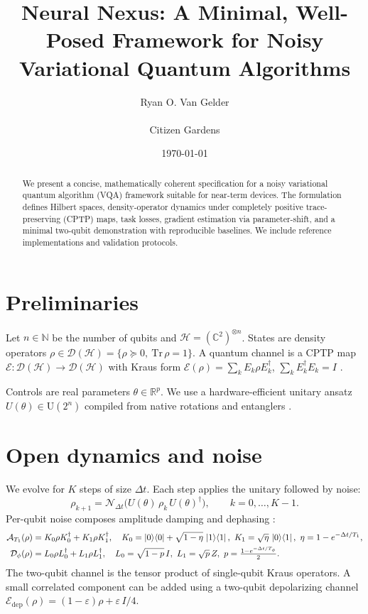 \documentclass[11pt]{article}
\title{Neural Nexus: A Minimal, Well-Posed Framework for Noisy Variational Quantum Algorithms}
\author{Ryan O. Van Gelder \\ \\ Citizen Gardens}
\date{\today}
\begin{document}
\maketitle

\begin{abstract}
We present a concise, mathematically coherent specification for a noisy variational quantum algorithm (VQA) framework suitable for near-term devices. The formulation defines Hilbert spaces, density-operator dynamics under completely positive trace-preserving (CPTP) maps, task losses, gradient estimation via parameter-shift, and a minimal two-qubit demonstration with reproducible baselines. We include reference implementations and validation protocols.
\end{abstract}

\section{Preliminaries}
Let \(n\in\mathbb N\) be the number of qubits and \(\mathcal H=(\mathbb C^{2})^{\otimes n}\). States are density operators \(\rho\in\mathcal D(\mathcal H)=\{\rho\succeq0,\ \mathrm{Tr}\,\rho=1\}\). A quantum channel is a CPTP map \(\mathcal E: \mathcal D(\mathcal H)\to\mathcal D(\mathcal H)\) with Kraus form \(\mathcal E(\rho)=\sum_k E_k\rho E_k^{\dagger}\), \(\sum_k E_k^{\dagger}E_k=I\) \cite{NielsenChuang,BreuerPetruccione}.

Controls are real parameters \(\theta\in\mathbb R^{p}\). We use a hardware-efficient unitary ansatz \(U(\theta)\in\mathrm{U}(2^n)\) compiled from native rotations and entanglers \cite{CerezoVQAReview}.

\section{Open dynamics and noise}
We evolve for \(K\) steps of size \(\Delta t\). Each step applies the unitary followed by noise:
\begin{equation}
  \rho_{k+1}=\mathcal N_{\Delta t}\!\big( U(\theta)\,\rho_k\,U(\theta)^{\dagger}\big),\qquad k=0,\dots,K-1.
\end{equation}
Per-qubit noise composes amplitude damping and dephasing \cite{NielsenChuang}:
\begin{align}
  \mathcal A_{T_1}(\rho) &= K_0\rho K_0^{\dagger}+K_1\rho K_1^{\dagger},\quad K_0=\ket{0}\!\bra{0}+\sqrt{1-\eta}\,\ket{1}\!\bra{1},\ K_1=\sqrt{\eta}\,\ket{0}\!\bra{1},\ \eta=1-e^{-\Delta t/T_1},\\
  \mathcal D_{\phi}(\rho) &= L_0\rho L_0^{\dagger}+L_1\rho L_1^{\dagger},\quad L_0=\sqrt{1-p}\,I,\ L_1=\sqrt{p}\,Z,\ p=\tfrac{1-e^{-\Delta t/T_\phi}}{2}.
\end{align}
The two-qubit channel is the tensor product of single-qubit Kraus operators. A small correlated component can be added using a two-qubit depolarizing channel \(\mathcal E_{\mathrm{dep}}(\rho)=(1-\varepsilon)\rho+\varepsilon\,I/4\).
\end{document}
